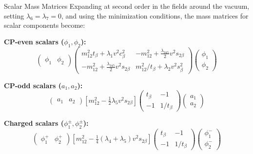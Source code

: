 \documentclass{../bredelebeamer}
\begin{document}
\begin{frame}{Scalar Mass Matrices}
    Expanding at second order in the fields around the vacuum, setting $\lambda_6 = \lambda_7 = 0$, and using the minimization conditions, the mass matrices for scalar components become:
    {\small
      \textbf{CP-even scalars ($\phi_1, \phi_2$):}
      \begin{equation*}
          \begin{pmatrix}
              \phi_1 & \phi_2
          \end{pmatrix}
          \begin{pmatrix}
              m_{12}^2 t_\beta + \lambda_1 v^2 c_\beta^2 & -m_{12}^2 + \frac{\lambda_{345}}{2} v^2 s_{2\beta} \\
              -m_{12}^2 + \frac{\lambda_{345}}{2} v^2 s_{2\beta} & m_{12}^2 / t_\beta + \lambda_2 v^2 s_\beta^2
          \end{pmatrix}
          \begin{pmatrix}
              \phi_1 \\ \phi_2
          \end{pmatrix}
      \end{equation*}

      \textbf{CP-odd scalars ($a_1, a_2$):}
      \begin{equation*}
          \begin{pmatrix}
              a_1 & a_2
          \end{pmatrix}
          \left[m_{12}^2 - \tfrac{1}{2} \lambda_5 v^2 s_{2\beta}\right]
          \begin{pmatrix}
              t_\beta & -1 \\
              -1 & 1/t_\beta
          \end{pmatrix}
          \begin{pmatrix}
              a_1 \\ a_2
          \end{pmatrix}
      \end{equation*}

      \textbf{Charged scalars ($\phi_1^\pm, \phi_2^\pm$):}
      \begin{equation*}
          \begin{pmatrix}
              \phi_1^+ & \phi_2^+
          \end{pmatrix}
          \left[m_{12}^2 - \tfrac{1}{4} (\lambda_4+\lambda_5) v^2 s_{2\beta}\right]
          \begin{pmatrix}
              t_\beta & -1 \\
              -1 & 1/t_\beta
          \end{pmatrix}
          \begin{pmatrix}
              \phi_1^- \\ \phi_2^-
          \end{pmatrix}
      \end{equation*}
    }\vfill
    

\end{frame}
\end{document}
